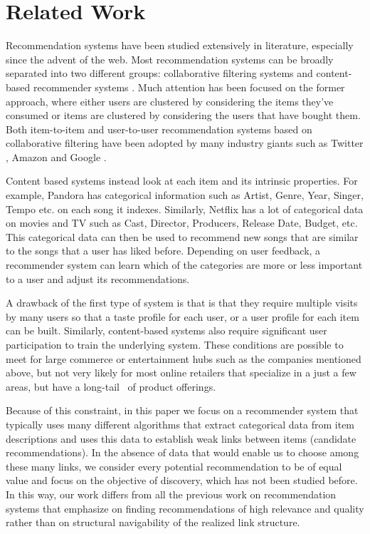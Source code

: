 \section{Related Work}

Recommendation systems have been studied extensively in literature, especially since the advent of the web. Most recommendation systems can be broadly separated into two different groups: collaborative filtering systems and content-based recommender systems \cite{almazro2010survey}. Much attention has been focused on the former approach, where either users are clustered by considering the items they've consumed or items are clustered by considering the users that have bought them. Both item-to-item and user-to-user recommendation systems based on collaborative filtering have been adopted by many industry giants such as Twitter \cite{twitter-collab-filtering}, Amazon \cite{amazon-collab-filtering} and Google \cite{google-collab-filtering}.  \vs

Content based systems instead look at each item and its intrinsic properties. For example, Pandora has categorical information such as Artist, Genre, Year, Singer, Tempo etc. on each song it indexes. Similarly, Netflix has a lot of categorical data on movies and TV such as Cast, Director, Producers, Release Date, Budget, etc. This categorical data can then be used to recommend new songs that are similar to the songs that a user has liked before. Depending on user feedback, a recommender system can learn which of the categories are more or less important to a user and adjust its recommendations. \vs

A drawback of the first type of system is that is that they require multiple visits by many users so that a taste profile for each user, or a user profile for each item can be built. 
Similarly, content-based systems also require significant user participation to train the underlying system. These conditions are possible to meet for large commerce or entertainment hubs such as the companies mentioned above, but not very likely for most online retailers that specialize in a just a few areas, but have a long-tail~\cite{Anderson2006} of product offerings. \vs

Because of this constraint, in this paper we focus on a recommender system that typically uses many different algorithms that extract categorical data from item descriptions and uses this data to establish weak links between items (candidate recommendations). In the absence of data that would enable us to choose among these many links, we consider every potential recommendation to be of equal value and focus on the objective of discovery, which has not been studied before. In this way, our work differs from all the previous work on recommendation systems that emphasize on finding recommendations of high relevance and quality rather than on structural navigability of the realized link structure.\vs

